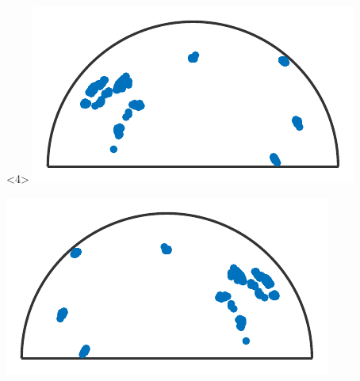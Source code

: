 \documentclass[compress]{beamer}
\begin{document}
\begin{frame}[fragile]
\begin{columns}
\begin{column}{0.33\textwidth}
\begin{overlayarea}{\textwidth}{\textheight}
    \begin{onlyenv}<4>
      \includegraphics[width=\textwidth]{pic/AxisDistri1}

      \includegraphics[width=\textwidth]{pic/AxisDistri2}
    \end{onlyenv}


\end{overlayarea}
\end{column}
\end{columns}
\end{frame}
\end{document}
